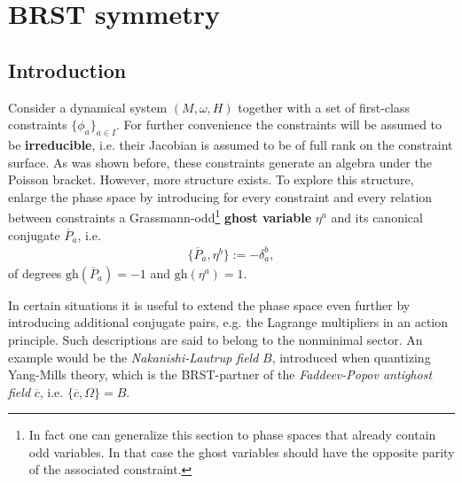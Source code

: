\section{BRST symmetry}\label{section:classical_brst}
\subsection{Introduction}

    Consider a dynamical system $(M,\omega,H)$ together with a set of first-class constraints $\{\phi_a\}_{a\in I}$. For further convenience the constraints will be assumed to be \textbf{irreducible}, i.e. their Jacobian is assumed to be of full rank on the constraint surface. As was shown before, these constraints generate an algebra under the Poisson bracket. However, more structure exists. To explore this structure, enlarge the phase space by introducing for every constraint and every relation between constraints a Grassmann-odd\footnote{In fact one can generalize this section to phase spaces that already contain odd variables. In that case the ghost variables should have the opposite parity of the associated constraint.} \textbf{ghost variable} $\eta^a$ and its canonical conjugate $\overline{P}_a$, i.e.
    \begin{gather}
        \{\overline{P}_a,\eta^b\} := -\delta^b_a,
    \end{gather}
    of degrees $\mathrm{gh}(\overline{P}_a) = -1$ and $\mathrm{gh}(\eta^a) = 1$.
    \begin{remark}
        In certain situations it is useful to extend the phase space even further by introducing additional conjugate pairs, e.g. the Lagrange multipliers in an action principle. Such descriptions are said to belong to the nonminimal sector. An example would be the \textit{Nakanishi-Lautrup field} $B$, introduced when quantizing Yang-Mills theory, which is the BRST-partner of the \textit{Faddeev-Popov antighost field} $\overline{c}$, i.e. $\{\overline{c},\Omega\}=B$.
    \end{remark}

